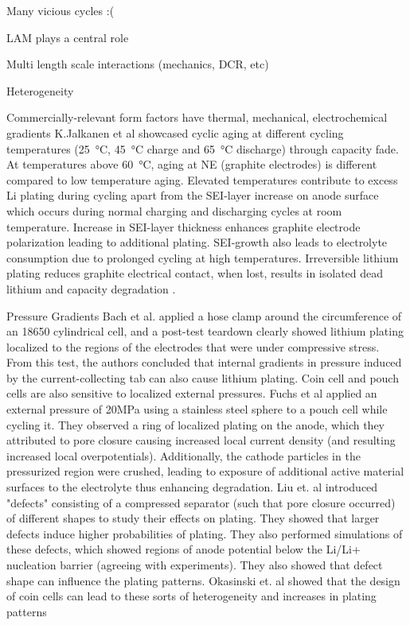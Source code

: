 \documentclass[journal=jpclcd,manuscript=article]{achemso}
\begin{document}
Many vicious cycles :(

LAM plays a central role

Multi length scale interactions (mechanics, DCR, etc)

Heterogeneity

Commercially-relevant form factors have thermal, mechanical, electrochemical gradients 
K.Jalkanen et al \cite{jalkanen_cycle_2015} showcased cyclic aging at different cycling temperatures (\SI{25}{\celsius}, \SI{45}{\celsius} charge and \SI{65}{\celsius} discharge) through capacity fade. At temperatures above \SI{60}{\celsius}, aging at NE (graphite electrodes) is different compared to low temperature aging. Elevated temperatures contribute to excess Li plating during  cycling apart from the SEI-layer increase on anode surface which occurs during normal charging and discharging cycles at room temperature. Increase in SEI-layer thickness enhances graphite electrode polarization leading to additional plating. SEI-growth also leads to electrolyte consumption due to prolonged cycling at high temperatures. Irreversible lithium plating reduces graphite electrical contact, when lost, results in isolated dead lithium and capacity degradation \cite{petzl_lithium_2015}.  

Pressure Gradients
Bach et al.\cite{bach_nonlinear_2016} applied a hose clamp around the circumference of an 18650 cylindrical cell, and a post-test teardown clearly showed lithium plating localized to the regions of the electrodes that were under compressive stress. From this test, the authors concluded that internal gradients in pressure induced by the current-collecting tab can also cause lithium plating. Coin cell and pouch cells are also sensitive to localized external pressures. Fuchs et al \cite{fuchs_post-mortem_2019} applied an external pressure of 20MPa using a stainless steel sphere to a pouch cell while cycling it. They observed a ring of localized plating on the anode, which they attributed to pore closure causing increased local current density (and resulting increased local overpotentials). Additionally, the cathode particles in the pressurized region were crushed, leading to exposure of additional active material surfaces to the electrolyte thus enhancing degradation. Liu et. al introduced "defects" consisting of a compressed separator (such that pore closure occurred) of different shapes to study their effects on plating. They showed that larger defects induce higher probabilities of plating. They also performed simulations of these defects, which showed regions of anode potential below the Li/Li+ nucleation barrier (agreeing with experiments). They also showed that defect shape can influence the plating patterns. \cite{liu_size_2018} Okasinski et. al showed that the design of coin cells can lead to these sorts of heterogeneity and increases in plating patterns \cite{okasinski_situ_2020}
\end{document}

